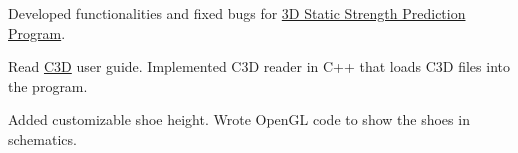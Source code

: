 \UM
{}

Developed functionalities and fixed bugs for \href{https://c4e.engin.umich.edu/tools-services/3dsspp-software/}{3D Static Strength Prediction Program}.

\begin{miniItemize}
    \item Read \href{https://www.c3d.org/}{C3D} user guide. Implemented C3D reader in C++ that loads C3D files into the program.
    \item Added customizable shoe height. Wrote OpenGL code to show the shoes in schematics.
\end{miniItemize}
